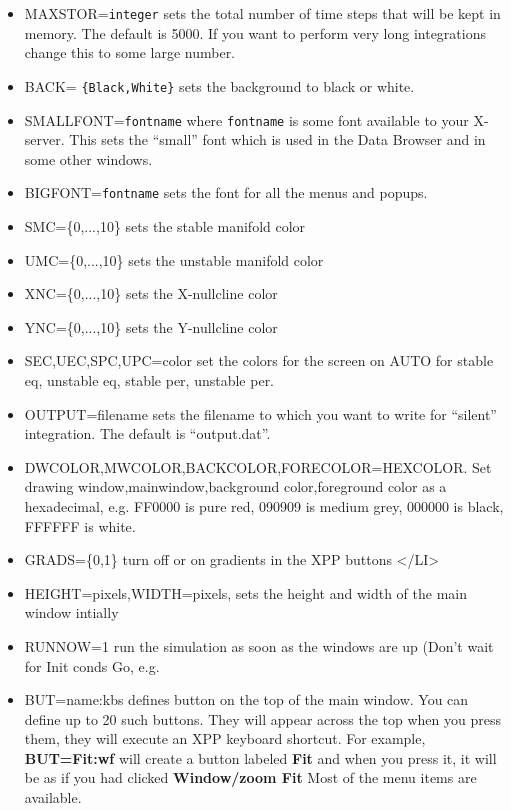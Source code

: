 \begin{itemize}\itemsep -.05in
\item MAXSTOR={\tt integer} sets the total number of time steps that
will be kept in memory.  The default is 5000.  If you want to perform 
very long integrations change this to some large number.  
\item BACK= {\tt \{Black,White\}} sets the background to black or white.
\item SMALLFONT={\tt fontname} where {\tt fontname} is some font available
to your X-server.  This sets the ``small'' font which is used in the
Data Browser and in some other windows.  
\item BIGFONT={\tt fontname} sets the font for all the menus and popups.  
\item SMC=\{0,...,10\} sets the stable manifold color
\item UMC=\{0,...,10\} sets the unstable manifold color
\item XNC=\{0,...,10\} sets the X-nullcline color
\item YNC=\{0,...,10\} sets the Y-nullcline color
\item SEC,UEC,SPC,UPC=color set the colors for the screen on AUTO for stable eq, unstable eq, stable per, unstable per.
\item OUTPUT=filename sets the filename to which you want to write for
``silent'' integration.  The default is ``output.dat''. 

\item DWCOLOR,MWCOLOR,BACKCOLOR,FORECOLOR=HEXCOLOR. Set drawing window,mainwindow,background color,foreground color as a hexadecimal, e.g. FF0000 is pure red, 090909 is medium grey, 000000 is black, FFFFFF is white. 
\item GRADS=\{0,1\} turn off or on gradients in the XPP buttons </LI>
\item HEIGHT=pixels,WIDTH=pixels, sets the height and width of the main window intially 
\item RUNNOW=1 run the simulation as soon as the windows are up (Don't wait for Init conds Go, e.g.
\item BUT=name:kbs defines button on the top of the main window. You
can define up to 20 such buttons. They will appear across the top  when
you press them, they will execute an XPP keyboard shortcut. For
example,  {\bf BUT=Fit:wf} will create a button labeled {\bf Fit}
and when you press it, it will be as if you had clicked {\bf 
Window/zoom Fit} Most of the menu items are available.
\end{itemize}

